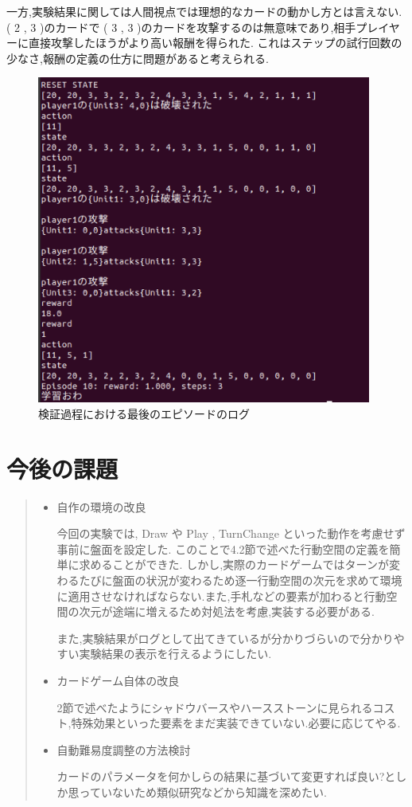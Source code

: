 \documentclass{jarticle}     %
\begin{document}
一方,実験結果に関しては人間視点では理想的なカードの動かし方とは言えない.
 ( 2 , 3 )のカードで ( 3 , 3 )のカードを攻撃するのは無意味であり,相手プレイヤーに直接攻撃したほうがより高い報酬を得られた.
これはステップの試行回数の少なさ,報酬の定義の仕方に問題があると考えられる.
\begin{figure}[htbp]
  \centering
  \includegraphics[width=110mm]{assets/Log.eps}
  \caption{検証過程における最後のエピソードのログ}
  \label{fig:Log}
\end{figure}

\section{今後の課題}


\begin{quote}
  \begin{itemize}
   \item 自作の環境の改良
   \par
    今回の実験では, Draw や Play , TurnChange といった動作を考慮せず事前に盤面を設定した.
    このことで4.2節で述べた行動空間の定義を簡単に求めることができた.
    しかし,実際のカードゲームではターンが変わるたびに盤面の状況が変わるため逐一行動空間の次元を求めて環境に適用させなければならない.また,手札などの要素が加わると行動空間の次元が途端に増えるため対処法を考慮,実装する必要がある.\par
    また,実験結果がログとして出てきているが分かりづらいので分かりやすい実験結果の表示を行えるようにしたい.
    \item カードゲーム自体の改良
    \par
    2節で述べたようにシャドウバースやハースストーンに見られるコスト,特殊効果といった要素をまだ実装できていない.必要に応じてやる.
    \item 自動難易度調整の方法検討
    \par
    カードのパラメータを何かしらの結果に基づいて変更すれば良い?としか思っていないため類似研究などから知識を深めたい.

  \end{itemize}
 \end{quote}



\end{document}
